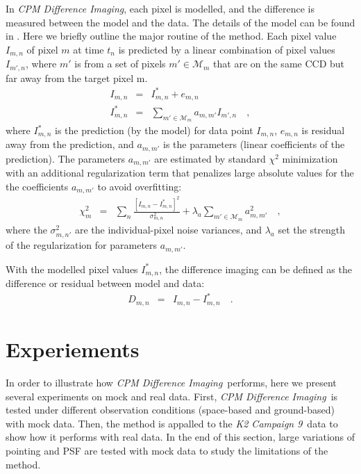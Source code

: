 \documentclass[12pt, preprint]{aastex}
\newcommand{\project}[1]{\textsl{#1}}
\newcommand{\cpmdiff}{\project{CPM Difference Imaging}}
\newcommand{\KTCN}{\project{K2 Campaign 9}}
\newcommand{\set}[1]{\mathcal{#1}}
\begin{document}
In \cpmdiff, each pixel is modelled, and the difference is measured between the model and the data. 
The details of the model can be found in \cite{cpm}. 
Here we briefly outline the major routine of the method. Each pixel value $I_{m,n}$ of pixel $m$ at time $t_n$ is predicted by a linear combination of pixel values $I_{m',n}$, where $m'$ is from a set of pixels $m'\in\set{M}_m$ that are on the same CCD but far away from the target pixel m.
\begin{eqnarray}
I_{m,n}         &=& I^{\ast}_{m,n} + e_{m,n}
\\
I^{\ast}_{m,n}  &=& \sum_{m'\in\set{M}_m} a_{m,m'}I_{m',n} 
\quad,
\end{eqnarray}
where $I^{\ast}_{m,n}$ is the prediction (by the model) for data point $I_{m,n}$, $e_{m,n}$ is residual away from the prediction, and $a_{m,m'}$ is the parameters (linear coefficients of the prediction).
The parameters $a_{m,m'}$ are estimated by standard $\chi^2$ minimization with an additional regularization term that penalizes large absolute values for the the coefficients $a_{m,m'}$ to avoid overfitting:
\begin{eqnarray}
\chi^2_{m}    &=& \sum_{n} \frac{[I_{m,n} - I^{\ast}_{m,n}]^2}{\sigma^2_{m,n}}+ \lambda_{a}\sum_{m'\in\set{M}_m}a_{m,m'}^2 
\quad,
\end{eqnarray}
where the $\sigma^2_{m,n'}$ are the individual-pixel noise variances, and $\lambda_{a}$ set the strength of the regularization for parameters $a_{m,m'}$.

With the modelled pixel values $I^{\ast}_{m,n}$, the difference imaging can be defined as the difference or residual between model and data:
\begin{eqnarray}
D_{m,n} &=& I_{m,n} - I^{\ast}_{m,n}
\quad.
\end{eqnarray}

\section{Experiements}
In order to illustrate how \cpmdiff\ performs, here we present several experiments on mock and real data. 
First, \cpmdiff\ is tested under different observation conditions (space-based and ground-based) with mock data. 
Then,  the method is appalled to the \KTCN\ data to show how it performs with real data. 
In the end of this section,  large variations of pointing and PSF are tested with mock data to study the limitations of the method.
\end{document}

